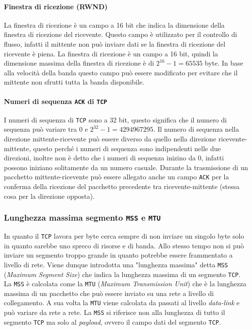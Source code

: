         \paragraph{Finestra di ricezione (RWND)} La finestra di ricezione è un campo a 16 bit che indica la dimensione della finestra di ricezione del ricevente. Questo campo è utilizzato per il controllo di flusso, infatti il mittente non può inviare dati se la finestra di ricezione del ricevente è piena. La finestra di ricezione è un campo a 16 bit, quindi la dimensione massima della finestra di ricezione è di $ 2^{16} - 1 = 65535 $ byte. In base alla velocità della banda questo campo può essere modificato per evitare che il mittente non sfrutti tutta la banda disponibile.
        \paragraph{Numeri di sequenza \texttt{ACK} di \texttt{TCP}} I numeri di sequenza di \texttt{TCP} sono a 32 bit, questo significa che il numero di sequenza può variare tra $ 0 $ e $ 2^{32} - 1 = 4294967295 $. Il numero di sequenza nella direzione mittente-ricevente può essere diverso da quello nella direzione ricevente-mittente, questo perché i numeri di sequenza sono indipendenti nelle due direzioni, inoltre non è detto che i numeri di sequenza inizino da $ 0 $, infatti possono iniziano solitamente da un numero casuale. Durante la trasmissione di un pacchetto mittente-ricevente può essere allegato anche un campo \texttt{ACK} per la conferma della ricezione del pacchetto precedente tra ricevente-mittente (stessa cosa per la direzione opposta).
        \subsubsection{Lunghezza massima segmento \texttt{MSS} e \texttt{MTU}}
            In quanto il \texttt{TCP} lavora per byte cerca sempre di non inviare un singolo byte solo in quanto sarebbe uno spreco di risorse e di banda. Allo stesso tempo non si può inviare un segmento troppo grande in quanto potrebbe essere frammentato a livello di rete. Viene dunque introdotta una "lunghezza massima" detta \texttt{MSS} (\textit{Maximum Segment Size}) che indica la lunghezza massima di un segmento \texttt{TCP}. La \texttt{MSS} è calcolata come la \texttt{MTU} (\textit{Maximum Transmission Unit}) che è la lunghezza massima di un pacchetto che può essere inviato su una rete a livello di collegamento. A sua volta la \texttt{MTU} viene calcolata da passati al livello \textit{data-link} e può variare da rete a rete. La \texttt{MSS} si riferisce non alla lunghezza di tutto il segmento \texttt{TCP} ma solo al \textit{payload}, ovvero il campo dati del segmento \texttt{TCP}.
